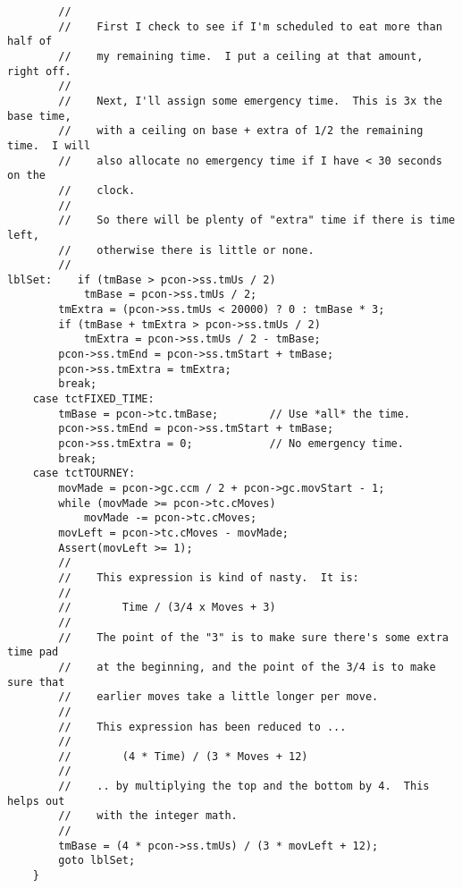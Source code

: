 \documentclass[10pt,dvipdfmx]{report}
\begin{document}
{\begin{verbatim}
        //
        //    First I check to see if I'm scheduled to eat more than half of
        //    my remaining time.  I put a ceiling at that amount, right off.
        //
        //    Next, I'll assign some emergency time.  This is 3x the base time,
        //    with a ceiling on base + extra of 1/2 the remaining time.  I will
        //    also allocate no emergency time if I have < 30 seconds on the
        //    clock.
        //
        //    So there will be plenty of "extra" time if there is time left,
        //    otherwise there is little or none.
        //
lblSet:    if (tmBase > pcon->ss.tmUs / 2)
            tmBase = pcon->ss.tmUs / 2;
        tmExtra = (pcon->ss.tmUs < 20000) ? 0 : tmBase * 3;
        if (tmBase + tmExtra > pcon->ss.tmUs / 2)
            tmExtra = pcon->ss.tmUs / 2 - tmBase;
        pcon->ss.tmEnd = pcon->ss.tmStart + tmBase;
        pcon->ss.tmExtra = tmExtra;
        break;
    case tctFIXED_TIME:
        tmBase = pcon->tc.tmBase;        // Use *all* the time.
        pcon->ss.tmEnd = pcon->ss.tmStart + tmBase;
        pcon->ss.tmExtra = 0;            // No emergency time.
        break;
    case tctTOURNEY:
        movMade = pcon->gc.ccm / 2 + pcon->gc.movStart - 1;
        while (movMade >= pcon->tc.cMoves)
            movMade -= pcon->tc.cMoves;
        movLeft = pcon->tc.cMoves - movMade;
        Assert(movLeft >= 1);
        //
        //    This expression is kind of nasty.  It is:
        //
        //        Time / (3/4 x Moves + 3)
        //
        //    The point of the "3" is to make sure there's some extra time pad
        //    at the beginning, and the point of the 3/4 is to make sure that
        //    earlier moves take a little longer per move.
        //
        //    This expression has been reduced to ...
        //
        //        (4 * Time) / (3 * Moves + 12)
        //
        //    .. by multiplying the top and the bottom by 4.  This helps out
        //    with the integer math.
        //
        tmBase = (4 * pcon->ss.tmUs) / (3 * movLeft + 12);
        goto lblSet;
    }
\end{verbatim}
}
\end{document}
